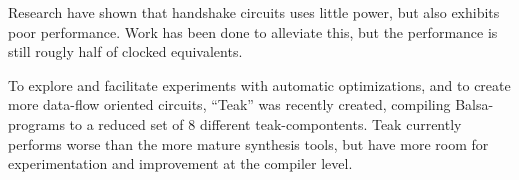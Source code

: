 Research have shown that handshake circuits uses little power\cite{xxx},
but also exhibits poor performance\cite{xxx}. Work has been done to
alleviate this\cite{xxx}, but the performance is still rougly half of
clocked equivalents.

To explore and facilitate experiments with automatic optimizations,
and to create more data-flow oriented circuits, ``Teak''\cite{teak}
was recently created, compiling Balsa-programs to a reduced set of 8
different teak-compontents. Teak currently performs worse than the
more mature synthesis tools, but have more room for experimentation
and improvement at the compiler level.


